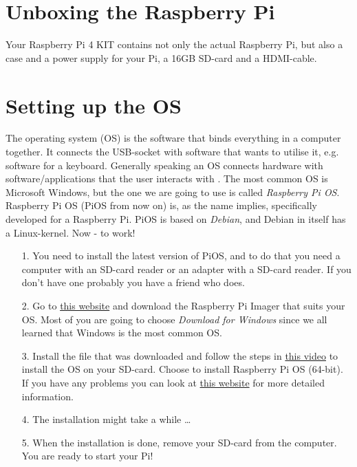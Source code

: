 \documentclass{article}
\begin{document}
\section{Unboxing the Raspberry Pi}
Your Raspberry Pi 4 KIT contains not only the actual Raspberry Pi, but also a case and a power supply for your Pi, a 16GB SD-card and a HDMI-cable.

\section{Setting up the OS}
The operating system (OS) is the software that binds everything in a computer together. It connects the USB-socket with software that wants to utilise it, e.g. software for a keyboard. Generally speaking an OS connects hardware with software/applications that the user interacts with \cite{OS}. The most common OS is Microsoft Windows, but the one we are going to use is called \emph{Raspberry Pi OS}. Raspberry Pi OS (PiOS from now on) is, as the name implies, specifically developed for a Raspberry Pi. PiOS is based on \emph{Debian}, and Debian in itself has a Linux-kernel. Now - to work! 

\begin{itemize}
\item[1.] You need to install the latest version of PiOS, and to do that you need a computer with an SD-card reader or an adapter with a SD-card reader. If you don't have one probably you have a friend who does.
\item[2.] Go to  {\color{blue}\href{https://www.raspberrypi.org/software/}{this website}} and download the Raspberry Pi Imager that suits your OS. Most of you are going to choose \emph{Download for Windows} since we all learned that Windows is the most common OS.
\item[3.] Install the file that was downloaded and follow the steps in {\color{blue}\href{https://www.youtube.com/watch?v=ntaXWS8Lk34}{this video}} to install the OS on your SD-card. Choose to install Raspberry Pi OS (64-bit). If you have any problems you can look at {\color{blue}\href{https://projects.raspberrypi.org/en/projects/raspberry-pi-setting-up/2}{this website}} for more detailed information.
\item[4.] The installation might take a while \ldots
\item[5.] When the installation is done, remove your SD-card from the computer. You are ready to start your Pi!
\end{itemize}
  
\end{document}
